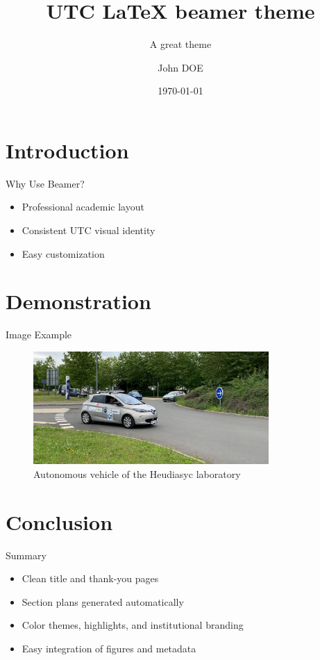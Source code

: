 \documentclass[aspectratio=169]{beamer}
\title{UTC LaTeX beamer theme}
\subtitle{A great theme}
\author{John DOE}
\institute{UTC / Heudiasyc Laboratory}
\date{\today}
\begin{document}
\frame[plain]{\utctitlepage}

\section{Introduction}

\begin{frame}{Why Use Beamer?}
  \begin{itemize}
    \item Professional academic layout
    \item Consistent UTC visual identity
    \item Easy customization
  \end{itemize}
\end{frame}

\section{Demonstration}

\begin{frame}{Image Example}
  \begin{figure}
    \centering
    \includegraphics[width=0.8\textwidth]{img/zoe_hds.jpg}
    \caption{Autonomous vehicle of the Heudiasyc laboratory}
  \end{figure}
\end{frame}

\section{Conclusion}

\begin{frame}{Summary}
  \begin{itemize}
    \item Clean title and thank-you pages
    \item Section plans generated automatically
    \item Color themes, highlights, and institutional branding
    \item Easy integration of figures and metadata
  \end{itemize}
\end{frame}

\end{document}
